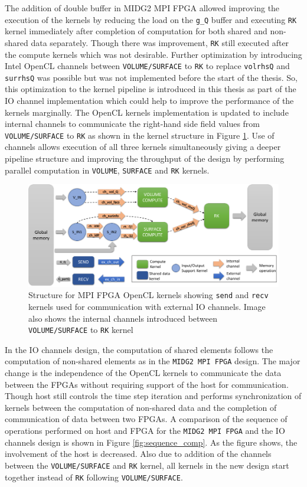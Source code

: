 The addition of double buffer in MIDG2 \ac{MPI} FPGA allowed improving the execution of the kernels
by reducing the load on the \texttt{g\_Q} buffer and executing \texttt{RK} kernel immediately after completion
of computation for both shared and non-shared data separately. Though there was improvement,
\texttt{RK} still executed after the compute kernels which was not desirable. Further optimization
by introducing Intel OpenCL channels between \texttt{VOLUME/SURFACE} to \texttt{RK} to replace
\texttt{volrhsQ} and \texttt{surrhsQ} was possible but was not implemented before the start of the thesis.
So, this optimization to the kernel pipeline is introduced in this thesis as part of the IO channel implementation
which could help to improve the performance of the kernels marginally.
The OpenCL kernels implementation is updated to include internal channels to
communicate the right-hand side field values
from \texttt{VOLUME/SURFACE} to \texttt{RK} as shown in the kernel structure
in Figure \ref{fig:iochan_kernstruc}. Use of channels allows execution of all three
kernels simultaneously giving a deeper pipeline structure and improving the throughput
of the design by performing parallel computation in \texttt{VOLUME}, \texttt{SURFACE} and \texttt{RK} kernels.

\begin{figure}[ht]%
    \centering
    \includegraphics[width=1.0\textwidth]{images/iochan_kernstruc}
    \caption{Structure for \ac{MPI} FPGA OpenCL kernels showing \texttt{send} and \texttt{recv}
    kernels used for communication with external IO channels. Image also shows the internal
    channels introduced between \texttt{VOLUME/SURFACE} to \texttt{RK} kernel}
    \label{fig:iochan_kernstruc}
\end{figure}

In the IO channels design, the computation of shared elements follows the computation of
non-shared elements as in the \texttt{MIDG2 MPI FPGA} design. The major change is the independence of the OpenCL kernels to
communicate the data between the FPGAs without requiring support of the host for
communication. Though host still controls the time step iteration and performs synchronization of kernels between
the computation of non-shared data and the completion of communication of data between two FPGAs.
A comparison of the sequence of operations performed on host and FPGA for the \texttt{MIDG2 MPI FPGA} and
the IO channels design is shown in Figure \ref{fig:sequence_comp}. As the figure shows,
the involvement of the host is decreased. Also due to addition of the channels between
the \texttt{VOLUME/SURFACE} and \texttt{RK} kernel, all kernels in the new design start together instead
of \texttt{RK} following \texttt{VOLUME/SURFACE}.

